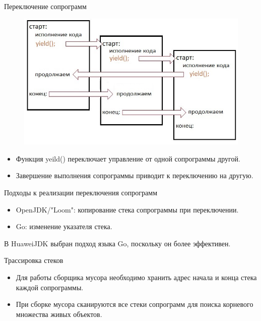\begin{frame}{Переключение сопрограмм}
	\begin{figure}
		\includegraphics[scale=0.5]{images/scheme.jpg}
	\end{figure}
	\par
	\begin{itemize}
		\item Функция yeild() переключает управление от одной сопрограммы другой.
		\item Завершение выполнения сопрограммы приводит к переключению на другую.
	\end{itemize}
\end{frame}

\begin{frame}{Подходы к реализации переключения сопрограмм}
	\begin{itemize}
		\item OpenJDK/"Loom": копирование стека сопрограммы при переключении.
		\item Go: изменение указателя стека.
	\end{itemize}

	В HuaweiJDK выбран подход языка Go, поскольку он более эффективен.
\end{frame}

\begin{frame}{Трассировка стеков}
	\begin{itemize}
		\item Для работы сборщика мусора необходимо хранить адрес начала и конца стека каждой сопрограммы.
		\item При сборке мусора сканируются все стеки сопрограмм для поиска корневого множества живых объектов.
	\end{itemize}
\end{frame}	

